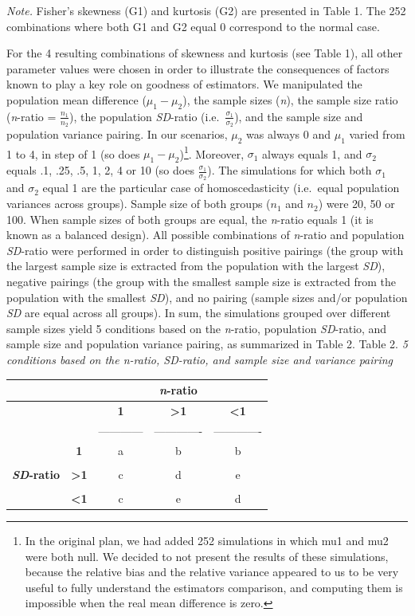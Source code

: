 \documentclass[
  man,floatsintext]{apa6}
\begin{document}
\emph{Note.} Fisher's skewness (G1) and kurtosis (G2) are presented in Table 1. The 252 combinations where both G1 and G2 equal 0 correspond to the normal case.

For the 4 resulting combinations of skewness and kurtosis (see Table 1), all other parameter values were chosen in order to illustrate the consequences of factors known to play a key role on goodness of estimators. We manipulated the population mean difference (\(\mu_1-\mu_2\)), the sample sizes (\emph{n}), the sample size ratio (\emph{n}-ratio = \(\frac{n_1}{n_2}\)), the population \emph{SD}-ratio (i.e.~\(\frac{\sigma_1}{\sigma_2}\)), and the sample size and population variance pairing. In our scenarios, \(\mu_2\) was always 0 and \(\mu_1\) varied from 1 to 4, in step of 1 (so does \(\mu_1-\mu_2\))\footnote{In the original plan, we had added 252 simulations in which mu1 and mu2 were both null. We decided to not present the results of these simulations, because the relative bias and the relative variance appeared to us to be very useful to fully understand the estimators comparison, and computing them is impossible when the real mean difference is zero. }. Moreover, \(\sigma_1\) always equals 1, and \(\sigma_2\) equals .1, .25, .5, 1, 2, 4 or 10 (so does \(\frac{\sigma_1}{\sigma_2}\)). The simulations for which both \(\sigma_1\) and \(\sigma_2\) equal 1 are the particular case of homoscedasticity (i.e.~equal population variances across groups). Sample size of both groups (\(n_1\) and \(n_2\)) were 20, 50 or 100. When sample sizes of both groups are equal, the \emph{n}-ratio equals 1 (it is known as a balanced design). All possible combinations of \emph{n}-ratio and population \emph{SD}-ratio were performed in order to distinguish positive pairings (the group with the largest sample size is extracted from the population with the largest \emph{SD}), negative pairings (the group with the smallest sample size is extracted from the population with the smallest \emph{SD}), and no pairing (sample sizes and/or population \emph{SD} are equal across all groups). In sum, the simulations grouped over different sample sizes yield 5 conditions based on the \emph{n}-ratio, population \emph{SD}-ratio, and sample size and population variance pairing, as summarized in Table 2.
Table 2.
\emph{5 conditions based on the n-ratio, SD-ratio, and sample size and variance pairing}

\begin{longtable}[]{@{}ccccc@{}}
\toprule
& & & \textbf{\emph{n}-ratio} &\tabularnewline
\midrule
\endhead
& & \textbf{1} & \textbf{\textgreater1} & \textbf{\textless1}\tabularnewline
& & ------------ & ------------- & -------------\tabularnewline
& \textbf{1} & a & b & b\tabularnewline
& & & &\tabularnewline
\textbf{\emph{SD}-ratio} & \textbf{\textgreater1} & c & d & e\tabularnewline
& & & &\tabularnewline
& \textbf{\textless1} & c & e & d\tabularnewline
\bottomrule
\end{longtable}
\end{document}
